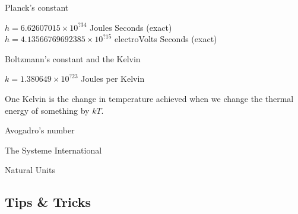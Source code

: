 \begin{frame}{Planck's constant}

$ h = 6.62607015\times10^{?34}$ Joules Seconds (exact)\\

$ h = 4.13566769692385\times10^{?15}$  electroVolts Seconds (exact)\\






\end{frame}

\begin{frame}{Boltzmann's constant and the Kelvin}

$k = 1.380649\times10^{?23} $ Joules per Kelvin

One Kelvin is the change in temperature achieved when we change the thermal energy of something by $kT$.


\end{frame}


\begin{frame}{Avogadro's number}

\end{frame}

\begin{frame}{The Systeme International}

\end{frame}

\begin{frame}{Natural Units}

\end{frame}



\subsection{Tips \& Tricks}

